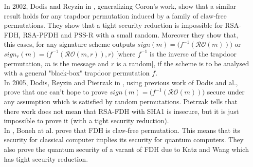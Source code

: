 \documentclass[a4paper,11pt]{article}
\begin{document}
In 2002, Dodis and Reyzin in \cite{Dodis}, generalizing Coron's work, show that a similar result holds for any trapdoor
 permutation induced by a family of claw-free permutations. They show that a tight security reduction is impossible for RSA-FDH, RSA-PFDH and PSS-R with a small random. Moreover they show that, this cases, for any signature scheme outputs $sign(m)=\big(f^{-1}(\mathcal{RO}(m))\big)$ or $sign_{r}(m)=\big(f^{-1}(\mathcal{RO}(m, r)), r\big)$ [where $f^{-1}$ is the inverse of the trapdoor permutation, $m$ is the message and $r$ is a random], if the scheme is to be analysed with a general "black-box" trapdoor permutation $f$.\\
In 2005, Dodis, Reyzin and Pietrzak in \cite{Dodis2},  using previous work of Dodis and al., prove that one can't hope to prove  $sign(m)=\big(f^{-1}(\mathcal{RO}(m))\big)$ secure under any assumption which is satisfied by random permutations. Pietrzak tells that there work does not mean that  RSA-FDH with SHA1  is insecure,  but it is just impossible to prove it (with a tight security reduction).\\
In \cite{pqROM}, Boneh at al. prove that FDH is claw-free permutation. This means that its security for classical computer implies its security for quantum computers. They also prove the quantum security of a varant of FDH due to Katz and Wang \cite{Katz} which has tight security reduction.
\end{document}
